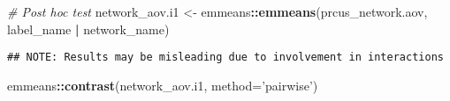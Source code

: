 \documentclass[
]{article}
\newenvironment{Shaded}{\begin{snugshade}}{\end{snugshade}}
\newcommand{\CommentTok}[1]{\textcolor[rgb]{0.56,0.35,0.01}{\textit{#1}}}
\newcommand{\DataTypeTok}[1]{\textcolor[rgb]{0.13,0.29,0.53}{#1}}
\newcommand{\KeywordTok}[1]{\textcolor[rgb]{0.13,0.29,0.53}{\textbf{#1}}}
\newcommand{\NormalTok}[1]{#1}
\newcommand{\OperatorTok}[1]{\textcolor[rgb]{0.81,0.36,0.00}{\textbf{#1}}}
\newcommand{\StringTok}[1]{\textcolor[rgb]{0.31,0.60,0.02}{#1}}
\begin{document}
\begin{Shaded}
\begin{Highlighting}[]
\CommentTok{# Post hoc test}
\NormalTok{network_aov.i1 <-}\StringTok{ }\NormalTok{emmeans}\OperatorTok{::}\KeywordTok{emmeans}\NormalTok{(prcus_network.aov, }\OperatorTok{~}\StringTok{ }\NormalTok{label_name }\OperatorTok{|}\StringTok{ }\NormalTok{network_name)}
\end{Highlighting}
\end{Shaded}

\begin{verbatim}
## NOTE: Results may be misleading due to involvement in interactions
\end{verbatim}

\begin{Shaded}
\begin{Highlighting}[]
\NormalTok{emmeans}\OperatorTok{::}\KeywordTok{contrast}\NormalTok{(network_aov.i1, }\DataTypeTok{method=}\StringTok{'pairwise'}\NormalTok{)}
\end{Highlighting}
\end{Shaded}
\end{document}
